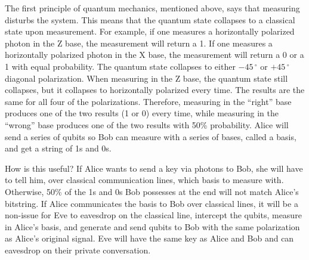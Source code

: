 \documentclass[12pt,twocolumn]{article}
\begin{document}

The first principle of quantum mechanics, mentioned above, says that measuring disturbs the system. This means that the quantum state collapses to a classical state upon measurement. For example, if one measures a horizontally polarized photon in the Z base, the measurement will return a 1. If one measures a horizontally polarized photon in the X base, the measurement will return a 0 or a 1 with equal probability. The quantum state collapses to either $-45\,^{\circ}$ or $+45\,^{\circ}$ diagonal polarization. When measuring in the Z base, the quantum state still collapses, but it collapses to horizontally polarized every time. The results are the same for all four of the polarizations. Therefore, measuring in the ``right” base produces one of the two results (1 or 0) every time, while measuring in the ``wrong” base produces one of the two results with 50\% probability. Alice will send a series of qubits so Bob can measure with a series of bases, called a basis, and get a string of 1s and 0s.

How is this useful? If Alice wants to send a key via photons to Bob, she will have to tell him, over classical communication lines, which basis to measure with. Otherwise, 50\% of the 1s and 0s Bob possesses at the end will not match Alice's bitstring. If Alice communicates the basis to Bob over classical lines, it will be a non-issue for Eve to eavesdrop on the classical line, intercept the qubits, measure in Alice's basis, and generate and send qubits to Bob with the same polarization as Alice's original signal. Eve will have the same key as Alice and Bob and can eavesdrop on their private conversation.
\end{document}
